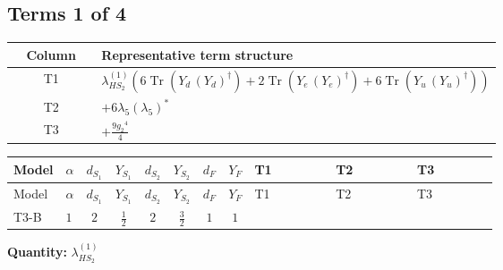 \documentclass[8pt]{article}
\begin{document}
\begin{landscape}
\subsection*{Terms 1 of 4}
\begin{center}
\begin{tabular}{@{}c >{\raggedright\arraybackslash}p{0.82\linewidth}@{}}
\toprule
Column & Representative term structure \\
\midrule
T1 & \(\displaystyle {\lambda_{HS_2}^{(1)}} (6 \operatorname{Tr}\!\left({Y_d}\,\left({Y_d}\right)^{\dagger}\right)+2 \operatorname{Tr}\!\left({Y_e}\,\left({Y_e}\right)^{\dagger}\right)+6 \operatorname{Tr}\!\left({Y_u}\,\left({Y_u}\right)^{\dagger}\right))\) \\
\midrule
T2 & \(\displaystyle +6 {\lambda_5} \left({\lambda_5}\right)^{*}\) \\
\midrule
T3 & \(\displaystyle +\frac{9 {g_2}^4}{4}\) \\
\midrule
\bottomrule
\end{tabular}
\end{center}
\smallskip
\tiny
\begin{longtable}{@{}llcccccc >{\raggedright\arraybackslash}p{0.21\linewidth} >{\raggedright\arraybackslash}p{0.21\linewidth} >{\raggedright\arraybackslash}p{0.21\linewidth}@{}}
\toprule
Model & $\alpha$ & $d_{S_1}$ & $Y_{S_1}$ & $d_{S_2}$ & $Y_{S_2}$ & $d_F$ & $Y_F$ & T1 & T2 & T3 \\
\midrule
\endfirsthead
\toprule
Model & $\alpha$ & $d_{S_1}$ & $Y_{S_1}$ & $d_{S_2}$ & $Y_{S_2}$ & $d_F$ & $Y_F$ & T1 & T2 & T3 \\
\midrule
\endhead
T3-B & $1$ & $2$ & $\frac{1}{2}$ & $2$ & $\frac{3}{2}$ & $1$ & $1$ & \scriptsize\adjustbox{max width=\linewidth}{$\begin{gathered} {\lambda_{HS_2}^{(1)}} (6 \operatorname{Tr}\!\left({Y_d}\,\left({Y_d}\right)^{\dagger}\right)+2 \operatorname{Tr}\!\left({Y_e}\,\left({Y_e}\right)^{\dagger}\right)+6 \operatorname{Tr}\!\left({Y_u}\,\left({Y_u}\right)^{\dagger}\right))\end{gathered}$} & \scriptsize\adjustbox{max width=\linewidth}{$\begin{gathered} +6 {\lambda_5} \left({\lambda_5}\right)^{*}\end{gathered}$} & \scriptsize\adjustbox{max width=\linewidth}{$\begin{gathered} +\frac{9 {g_2}^4}{4}\end{gathered}$} \\
\midrule
\bottomrule
\end{longtable}
\clearpage
\noindent\textbf{Quantity: }$\lambda_{HS_2}^{(1)}$\par\smallskip

\end{landscape}
\end{document}
